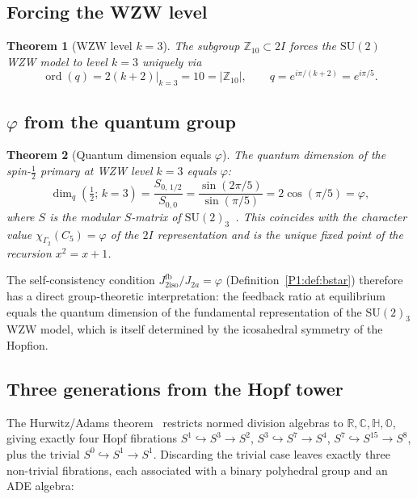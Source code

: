 \documentclass[11pt,a4paper]{article}
\newtheorem{theorem}{Theorem}[section]
\theoremstyle{definition}
\theoremstyle{remark}
\newcommand{\vp}{\varphi}
\newcommand{\Jfb}{J_{2\mathrm{iso}}^{\mathrm{fb}}}
\newcommand{\Ja}{J_{2a}}
\newcommand{\ord}{\operatorname{ord}}
\begin{document}
\subsection{Forcing the WZW level}

\begin{theorem}[WZW level $k=3$]
\label{P1:thm:k3}
The subgroup $\mathbb{Z}_{10}\subset 2I$ forces the $\mathrm{SU}(2)$ WZW
model to level $k=3$ uniquely via
\begin{equation}
  \ord(q) = 2(k+2)\big|_{k=3} = 10 = |\mathbb{Z}_{10}|,
  \qquad
  q = e^{i\pi/(k+2)} = e^{i\pi/5}.
  \label{P1:eq:q}
\end{equation}
\end{theorem}

\subsection{$\varphi$ from the quantum group}

\begin{theorem}[Quantum dimension equals $\vp$]
\label{P1:thm:dimq}
The quantum dimension of the spin-$\tfrac{1}{2}$ primary at WZW level $k=3$
equals $\vp$:
\begin{equation}
  \dim_q\!\left(\tfrac{1}{2};\,k=3\right)
  = \frac{S_{0,\,1/2}}{S_{0,0}}
  = \frac{\sin(2\pi/5)}{\sin(\pi/5)}
  = 2\cos(\pi/5)
  = \vp,
  \label{P1:eq:dimq}
\end{equation}
where $S$ is the modular $S$-matrix of $\mathrm{SU}(2)_3$~\cite{Verlinde1988}.  This
coincides with the character value $\chi_{\Gamma_2}(C_5)=\vp$ of the
$2I$ representation and is the unique fixed point of the recursion
$x^2 = x+1$.
\end{theorem}

The self-consistency condition $\Jfb/\Ja=\vp$ (Definition~\ref{P1:def:bstar})
therefore has a direct group-theoretic interpretation: the feedback ratio
at equilibrium equals the quantum dimension of the fundamental
representation of the $\mathrm{SU}(2)_3$ WZW model, which is itself
determined by the icosahedral symmetry of the Hopfion.

\subsection{Three generations from the Hopf tower}

The Hurwitz/Adams theorem~\cite{Hurwitz1898,Adams1960} restricts normed division algebras to
$\mathbb{R},\mathbb{C},\mathbb{H},\mathbb{O}$, giving exactly four Hopf
fibrations $S^1\hookrightarrow S^3\to S^2$, $S^3\hookrightarrow S^7\to
S^4$, $S^7\hookrightarrow S^{15}\to S^8$, plus the trivial $S^0\hookrightarrow
S^1\to S^1$.  Discarding the trivial case leaves exactly three non-trivial
fibrations, each associated with a binary polyhedral group and an ADE
algebra:
\end{document}
